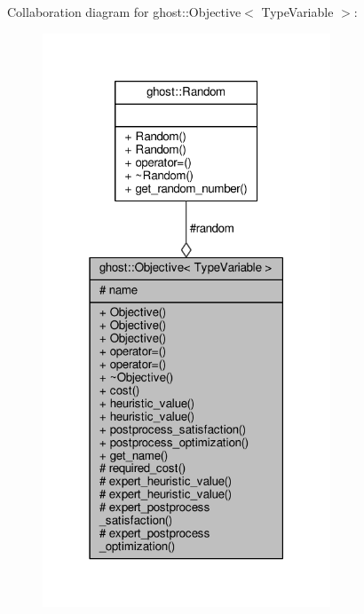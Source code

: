 Collaboration diagram for ghost\+:\+:Objective$<$ Type\+Variable $>$\+:
\nopagebreak
\begin{figure}[H]
\begin{center}
\leavevmode
\includegraphics[width=243pt]{classghost_1_1Objective__coll__graph}
\end{center}
\end{figure}
